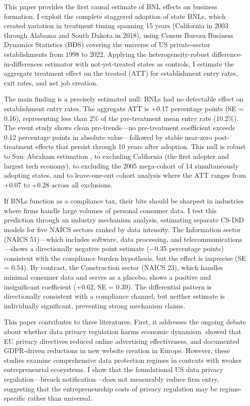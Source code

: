 \documentclass[12pt]{article}
\begin{document}
This paper provides the first causal estimate of BNL effects on business formation. I exploit the complete staggered adoption of state BNLs, which created variation in treatment timing spanning 15 years (California in 2003 through Alabama and South Dakota in 2018), using Census Bureau Business Dynamics Statistics (BDS) covering the universe of US private-sector establishments from 1998 to 2022. Applying the \citet{callaway2021difference} heterogeneity-robust difference-in-differences estimator with not-yet-treated states as controls, I estimate the aggregate treatment effect on the treated (ATT) for establishment entry rates, exit rates, and net job creation.

The main finding is a precisely estimated null: BNLs had no detectable effect on establishment entry rates. The aggregate ATT is +0.17 percentage points (SE = 0.16), representing less than 2\% of the pre-treatment mean entry rate (10.2\%). The event study shows clean pre-trends---no pre-treatment coefficient exceeds 0.12 percentage points in absolute value---followed by stable near-zero post-treatment effects that persist through 10 years after adoption. This null is robust to Sun--Abraham estimation \citep{sun2021estimating}, to excluding California (the first adopter and largest tech economy), to excluding the 2005 mega-cohort of 14 simultaneously adopting states, and to leave-one-out cohort analysis where the ATT ranges from +0.07 to +0.28 across all exclusions.

If BNLs function as a compliance tax, their bite should be sharpest in industries where firms handle large volumes of personal consumer data. I test this prediction through an industry mechanism analysis, estimating separate CS-DiD models for five NAICS sectors ranked by data intensity. The Information sector (NAICS 51)---which includes software, data processing, and telecommunications---shows a directionally negative point estimate ($-$0.35 percentage points) consistent with the compliance burden hypothesis, but the effect is imprecise (SE = 0.54). By contrast, the Construction sector (NAICS 23), which handles minimal consumer data and serves as a placebo, shows a positive and insignificant coefficient (+0.62, SE = 0.39). The differential pattern is directionally consistent with a compliance channel, but neither estimate is individually significant, preventing strong mechanism claims.

This paper contributes to three literatures. First, it addresses the ongoing debate about whether data privacy regulation harms economic dynamism. \citet{goldfarb2011privacy} showed that EU privacy directives reduced online advertising effectiveness, and \citet{bailey2019gdpr} documented GDPR-driven reductions in new website creation in Europe. However, these studies examine comprehensive data protection regimes in contexts with weaker entrepreneurial ecosystems. I show that the foundational US data privacy regulation---breach notification---does not measurably reduce firm entry, suggesting that the entrepreneurship costs of privacy regulation may be regime-specific rather than universal.
\end{document}
